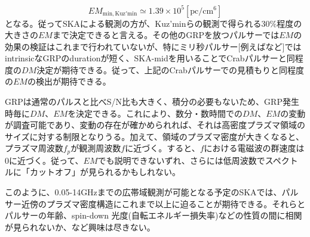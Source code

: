\begin{equation}
EM_{\mathrm{min, Kuz'min}}\simeq1.39\times10^{5} [\mathrm{pc/cm^{6}}]
\end{equation}
となる。従ってSKAによる観測の方が、Kuz'minらの観測で得られる30\%程度の大きさの$EM$まで決定できると言える。その他のGRPを放つパルサーでは$EM$の効果の検証はこれまで行われていないが、特にミリ秒パルサー$[$例えば\cite{So04, Bi14}など$]$ではintrinsicなGRPのdurationが短く、SKA-midを用いることでCrabパルサーと同程度の$DM$決定が期待できる。従って、上記のCrabパルサーでの見積もりと同程度の$EM$の検出が期待できる。

GRPは通常のパルスと比べS/N比も大きく、積分の必要もないため、GRP発生時毎に$DM$、$EM$を決定できる。これにより、数分・数時間での$DM$、$EM$の変動が調査可能であり、変動の存在が確かめられれば、それは高密度プラズマ領域のサイズに対する制限となりうる。加えて、領域のプラズマ密度が大きくなると、プラズマ周波数$f_{p}$が観測周波数$f$に近づく。すると、$f$における電磁波の群速度は0に近づく。従って、$EM$でも説明できないずれ、さらには低周波数でスペクトルに「カットオフ」が見られるかもしれない。

このように、0.05-14GHzまでの広帯域観測が可能となる予定のSKAでは、パルサー近傍のプラズマ密度構造にこれまで以上に迫ることが期待できる。それらとパルサーの年齢、spin-down 光度(自転エネルギー損失率)などの性質の間に相関が見られないか、など興味は尽きない。


